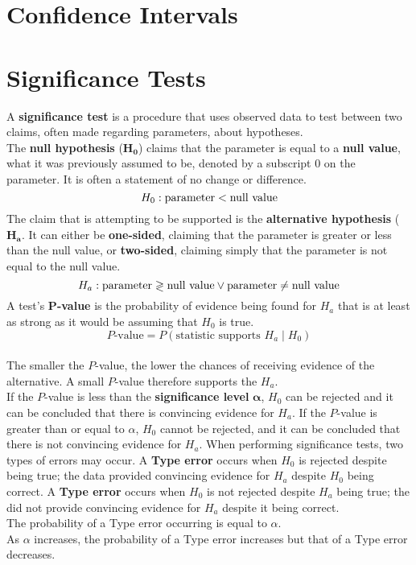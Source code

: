 \documentclass[../AP_Statistics.tex]{subfiles}
\begin{document}
	\chapter{Confidence Intervals}
	\chapter{Significance Tests}
		A \textbf{significance test} is a procedure that uses observed data to test between two claims, often made regarding parameters, about hypotheses. \\
		The \textbf{null hypothesis} ($\pmb{H_0}$) claims that the parameter is equal to a \textbf{null value}, what it was previously assumed to be, denoted by a subscript $0$ on the parameter. It is often a statement of no change or difference.
		$$H_0:\rm{parameter} < \text{null value}$$
		The claim that is attempting to be supported is the \textbf{alternative hypothesis} ($\pmb{H_a}$. It can either be \textbf{one-sided}, claiming that the parameter is greater or less than the null value, or \textbf{two-sided}, claiming simply that the parameter is not equal to the null value.
		$$H_a:\rm{parameter} \gtrless \text{null value} \lor \rm{parameter} \ne \text{null value}$$
		A test's $\pmb{P}$\textbf{-value} is the probability of evidence being found for $H_a$ that is at least as strong as it would be assuming that $H_0$ is true.
		$$P\text{-value} = P(\text{statistic supports } H_a \mid H_0)$$ \\
		The smaller the $P$-value, the lower the chances of receiving evidence of the alternative. A small $P$-value therefore supports the $H_a$. \\
		If the $P$-value is less than the \textbf{significance level} $\pmb{\alpha}$, $H_0$ can be rejected and it can be concluded that there is convincing evidence for $H_a$. If the $P$-value is greater than or equal to $\alpha$, $H_0$ cannot be rejected, and it can be concluded that there is not convincing evidence for $H_a$.
		When performing significance tests, two types of errors may occur. A \textbf{Type  error} occurs when $H_0$ is rejected despite being true; the data provided convincing evidence for $H_a$ despite $H_0$ being correct. A \textbf{Type  error} occurs when $H_0$ is not rejected despite $H_a$ being true; the did not provide convincing evidence for $H_a$ despite it being correct. \\
		The probability of a Type  error occurring is equal to $\alpha$. \\
		As $\alpha$ increases, the probability of a Type  error increases but that of a Type  error decreases.
\end{document}
